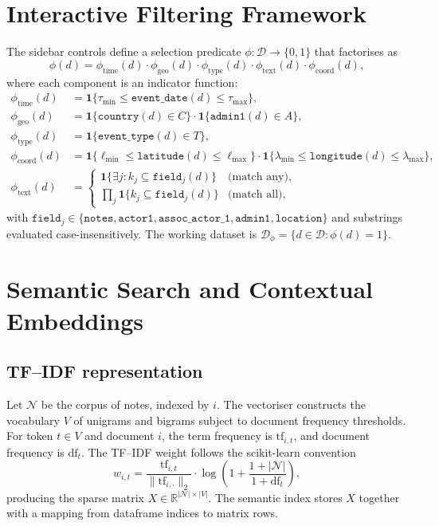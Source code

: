\documentclass[11pt]{article}
\begin{document}
\section{Interactive Filtering Framework}
The sidebar controls define a selection predicate $\phi: \mathcal{D} \to \{0,1\}$ that factorises as
\[ \phi(d) = \phi_{\text{time}}(d) \cdot \phi_{\text{geo}}(d) \cdot \phi_{\text{type}}(d) \cdot \phi_{\text{text}}(d) \cdot \phi_{\text{coord}}(d), \]
where each component is an indicator function:
\begin{align*}
  \phi_{\text{time}}(d) &= \mathbf{1}\{\tau_{\min} \le \texttt{event\_date}(d) \le \tau_{\max}\},\\
  \phi_{\text{geo}}(d) &= \mathbf{1}\{\texttt{country}(d) \in C\} \cdot \mathbf{1}\{\texttt{admin1}(d) \in A\},\\
  \phi_{\text{type}}(d) &= \mathbf{1}\{\texttt{event\_type}(d) \in T\},\\
  \phi_{\text{coord}}(d) &= \mathbf{1}\{\ell_{\min} \le \texttt{latitude}(d) \le \ell_{\max}\} \cdot \mathbf{1}\{\lambda_{\min} \le \texttt{longitude}(d) \le \lambda_{\max}\},\\
  \phi_{\text{text}}(d) &= \begin{cases}
    \mathbf{1}\{\exists j : k_j \subseteq \texttt{field}_j(d)\} & \text{(match any)},\\
    \prod_j \mathbf{1}\{k_j \subseteq \texttt{field}_j(d)\} & \text{(match all)},
  \end{cases}
\end{align*}
with $\texttt{field}_j \in \{\texttt{notes}, \texttt{actor1}, \texttt{assoc\_actor\_1}, \texttt{admin1}, \texttt{location}\}$ and substrings evaluated case-insensitively. The working dataset is $\mathcal{D}_\phi = \{d \in \mathcal{D} : \phi(d) = 1\}$.

\section{Semantic Search and Contextual Embeddings}
\subsection{TF--IDF representation}
Let $\mathcal{N}$ be the corpus of notes, indexed by $i$. The vectoriser constructs the vocabulary $V$ of unigrams and bigrams subject to document frequency thresholds. For token $t \in V$ and document $i$, the term frequency is $\mathrm{tf}_{i,t}$, and document frequency is $\mathrm{df}_t$. The TF--IDF weight follows the scikit-learn convention
\[ w_{i,t} = \frac{\mathrm{tf}_{i,t}}{\lVert \mathrm{tf}_{i,\cdot} \rVert_2} \cdot \log\left(1 + \frac{1 + |\mathcal{N}|}{1 + \mathrm{df}_t}\right), \]
producing the sparse matrix $X \in \mathbb{R}^{|\mathcal{N}| \times |V|}$. The semantic index stores $X$ together with a mapping from dataframe indices to matrix rows.
\end{document}
